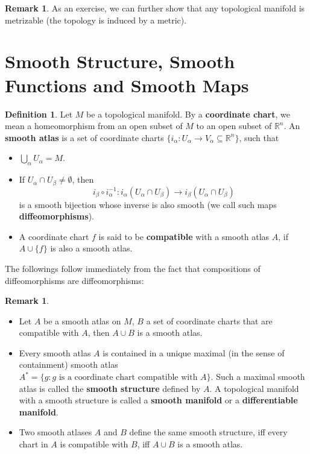 \documentclass{article}
\theoremstyle{definition}
\newtheorem{dfn}[thm]{Definition}
\newtheorem{rmk}[thm]{Remark}
\begin{document}
\begin{rmk}
    As an exercise, we can further show that any topological manifold is metrizable (the topology is induced by a metric).
\end{rmk}

\newpage

\section{Smooth Structure, Smooth Functions and Smooth Maps}

\begin{dfn}
    Let $M$ be a topological manifold. By a {\bf coordinate chart}, we mean a homeomorphism from an open subset of $M$ to an open subset of $\mathbb{R}^n$. An {\bf smooth atlas} is a set of coordinate charts $\{i_\alpha: U_\alpha\rightarrow V_\alpha\subseteq \mathbb{R}^n\}$, such that
    \begin{itemize}
        \item $\bigcup_\alpha U_\alpha=M$.
        \item If $U_\alpha\cap U_\beta\not=\emptyset$, then 
        \[i_\beta\circ i_\alpha^{-1}: i_\alpha(U_\alpha\cap U_\beta)\rightarrow i_\beta(U_\alpha\cap U_\beta)\]
        is a smooth bijection whose inverse is also smooth (we call such maps {\bf diffeomorphisms}).
        \item A coordinate chart $f$ is said to be {\bf compatible} with a smooth atlas $A$, if $A\cup\{f\}$ is also a smooth atlas.
    \end{itemize}
\end{dfn}

The followings follow immediately from the fact that compositions of diffeomorphisms are diffeomorphisms:

\begin{rmk}
    \begin{itemize}
        \item Let $A$ be a smooth atlas on $M$, $B$ a set of coordinate charts that are compatible with $A$, then $A\cup B$ is a smooth atlas.
        \item Every smooth atlas $A$ is contained in a unique maximal (in the sense of containment) smooth atlas $A^*=\{g: g\text{ is a coordinate chart compatible with }A\}$. Such a maximal smooth atlas is called the {\bf smooth structure} defined by $A$. A topological manifold with a smooth structure is called a {\bf smooth manifold} or a {\bf differentiable manifold}.
        \item Two smooth atlases $A$ and $B$ define the same smooth structure, iff every chart in $A$ is compatible with $B$, iff $A\cup B$ is a smooth atlas.
    \end{itemize}    
\end{rmk}
\end{document}
